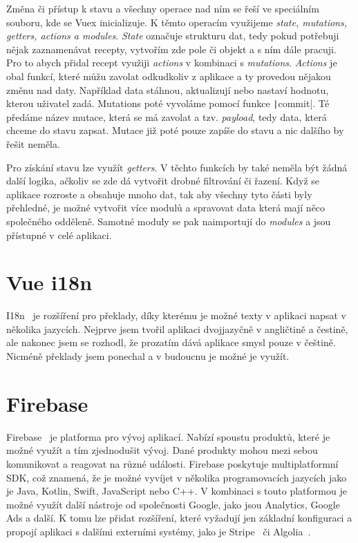 Změna či přístup k stavu a všechny operace nad ním se řeší ve speciálním souboru, kde se Vuex inicializuje. K těmto operacím využijeme \emph{state, mutations, getters, actions a modules}.
\emph{State} označuje strukturu dat, tedy pokud potřebuji nějak zaznamenávat recepty, vytvořím zde pole či objekt a s ním dále pracuji. Pro to abych přidal recept využiji \emph{actions} v kombinaci s
\emph{mutations}. \emph{Actions} je obal funkcí, které můžu zavolat odkudkoliv z aplikace a ty provedou nějakou změnu nad daty. Například data stáhnou, aktualizují nebo nastaví hodnotu, kterou uživatel
zadá. Mutations poté vyvoláme pomocí funkce \texttt|commit|. Té předáme název mutace, která se má zavolat a tzv. \emph{payload}, tedy data, která chceme do stavu zapsat. Mutace již poté pouze zapíše
do stavu a nic dalšího by řešit neměla.

Pro získání stavu lze využít \emph{getters}. V těchto funkcích by také neměla být žádná další logika, ačkoliv se zde dá vytvořit drobné filtrování či řazení.
Když se aplikace rozroste a obsahuje mnoho dat, tak aby všechny tyto části byly přehledné, je možné vytvořit více modulů a spravovat data která mají něco společného
odděleně. Samotné moduly se pak naimportují do \emph{modules} a jsou přístupné v celé aplikaci.

\section{Vue i18n}
I18n~\cite{i18n} je rozšíření pro překlady, díky kterému je možné texty v aplikaci napsat v několika jazycích. Nejprve jsem tvořil aplikaci dvojjazyčně
v angličtině a čestině, ale nakonec jsem se rozhodl, že prozatím dává aplikace smysl pouze v češtině. Nicméně překlady jsem ponechal a v budoucnu
je možné je využít.

\section{Firebase}
Firebase~\cite{Firebase} je platforma pro vývoj aplikací. Nabízí spoustu produktů, které je možné využít a tím zjednodušit vývoj.
Dané produkty mohou mezi sebou komunikovat a reagovat na různé události. Firebase poskytuje multiplatformní SDK, což znamená, že je
možné vyvíjet v několika programovacích jazycích jako je Java, Kotlin, Swift, JavaScript nebo C++. V kombinaci s touto platformou je možné
využít další nástroje od společnosti Google, jako jsou Analytics, Google Ads a další. K tomu lze přidat rozšíření, které vyžadují jen základní
konfiguraci a propojí aplikaci s dalšími externími systémy, jako je Stripe~\cite{Stripe} či Algolia~\cite{Algolia}.

